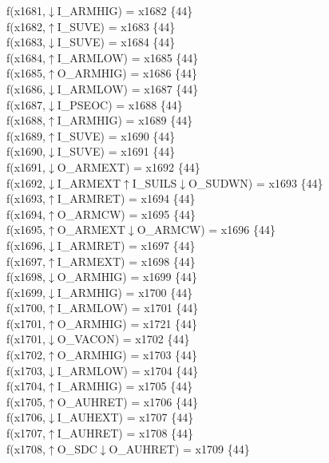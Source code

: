 f(x1681,$\downarrow$I\_ARMHIG) = x1682 \{44\} \\  
f(x1682,$\uparrow$I\_SUVE) = x1683 \{44\} \\  
f(x1683,$\downarrow$I\_SUVE) = x1684 \{44\} \\  
f(x1684,$\uparrow$I\_ARMLOW) = x1685 \{44\} \\  
f(x1685,$\uparrow$O\_ARMHIG) = x1686 \{44\} \\  
f(x1686,$\downarrow$I\_ARMLOW) = x1687 \{44\} \\  
f(x1687,$\downarrow$I\_PSEOC) = x1688 \{44\} \\  
f(x1688,$\uparrow$I\_ARMHIG) = x1689 \{44\} \\  
f(x1689,$\uparrow$I\_SUVE) = x1690 \{44\} \\  
f(x1690,$\downarrow$I\_SUVE) = x1691 \{44\} \\  
f(x1691,$\downarrow$O\_ARMEXT) = x1692 \{44\} \\  
f(x1692,$\downarrow$I\_ARMEXT$\uparrow$I\_SUILS$\downarrow$O\_SUDWN) = x1693 \{44\} \\  
f(x1693,$\uparrow$I\_ARMRET) = x1694 \{44\} \\  
f(x1694,$\uparrow$O\_ARMCW) = x1695 \{44\} \\  
f(x1695,$\uparrow$O\_ARMEXT$\downarrow$O\_ARMCW) = x1696 \{44\} \\  
f(x1696,$\downarrow$I\_ARMRET) = x1697 \{44\} \\  
f(x1697,$\uparrow$I\_ARMEXT) = x1698 \{44\} \\  
f(x1698,$\downarrow$O\_ARMHIG) = x1699 \{44\} \\  
f(x1699,$\downarrow$I\_ARMHIG) = x1700 \{44\} \\  
f(x1700,$\uparrow$I\_ARMLOW) = x1701 \{44\} \\  
f(x1701,$\uparrow$O\_ARMHIG) = x1721 \{44\} \\  
f(x1701,$\downarrow$O\_VACON) = x1702 \{44\} \\  
f(x1702,$\uparrow$O\_ARMHIG) = x1703 \{44\} \\  
f(x1703,$\downarrow$I\_ARMLOW) = x1704 \{44\} \\  
f(x1704,$\uparrow$I\_ARMHIG) = x1705 \{44\} \\  
f(x1705,$\uparrow$O\_AUHRET) = x1706 \{44\} \\  
f(x1706,$\downarrow$I\_AUHEXT) = x1707 \{44\} \\  
f(x1707,$\uparrow$I\_AUHRET) = x1708 \{44\} \\  
f(x1708,$\uparrow$O\_SDC$\downarrow$O\_AUHRET) = x1709 \{44\} \\  
